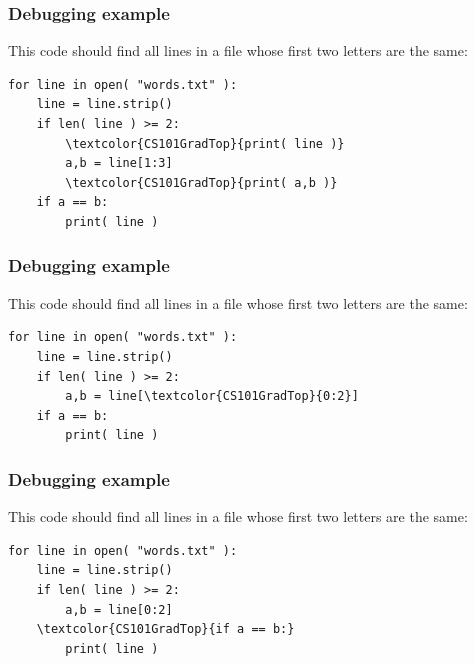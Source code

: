 \documentclass[11pt]{beamer}
\begin{document}
\begin{frame}[fragile]
  \frametitle{Debugging example}

  This code should find all lines in a file whose first two letters are the same:
  \begin{Verbatim}[commandchars=\\\{\},commentchar=\%]
for line in open( "words.txt" ):
    line = line.strip()
    if len( line ) >= 2:
        \textcolor{CS101GradTop}{print( line )}
        a,b = line[1:3]
        \textcolor{CS101GradTop}{print( a,b )}
    if a == b:
        print( line )
  \end{Verbatim}
\end{frame}

\begin{frame}[fragile]
  \frametitle{Debugging example}

  This code should find all lines in a file whose first two letters are the same:
  \begin{Verbatim}[commandchars=\\\{\},commentchar=\%]
for line in open( "words.txt" ):
    line = line.strip()
    if len( line ) >= 2:
        a,b = line[\textcolor{CS101GradTop}{0:2}]
    if a == b:
        print( line )
  \end{Verbatim}
\end{frame}

\begin{frame}[fragile]
  \frametitle{Debugging example}

  This code should find all lines in a file whose first two letters are the same:
  \begin{Verbatim}[commandchars=\\\{\},commentchar=\%]
for line in open( "words.txt" ):
    line = line.strip()
    if len( line ) >= 2:
        a,b = line[0:2]
    \textcolor{CS101GradTop}{if a == b:}
        print( line )
  \end{Verbatim}
\end{frame}

\end{document}
